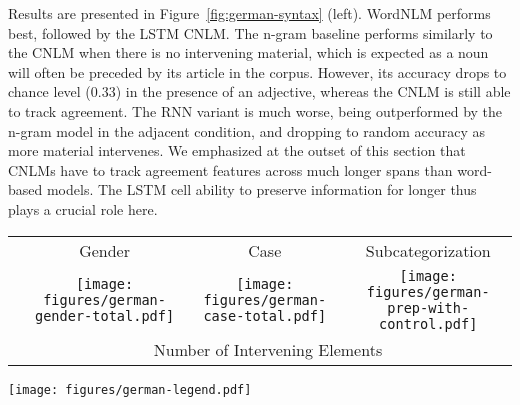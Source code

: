 Results are presented in Figure~\ref{fig:german-syntax}
(left). WordNLM performs best, followed by the LSTM CNLM.  The n-gram
baseline performs similarly to the CNLM when there is no intervening
material, which is expected as a noun will often be preceded by its
article in the corpus. However, its accuracy drops to chance level
(0.33) in the presence of an adjective, whereas the CNLM is still able
to track agreement. %
The RNN variant is much worse, being outperformed by the n-gram model
in the adjacent condition, and dropping to random accuracy as more
material intervenes. We emphasized at the outset of this section that
CNLMs have to track agreement features across much longer spans than
word-based models. The LSTM cell ability to preserve information for
longer thus plays a crucial role here.



\begin{figure*}
	\begin{tabular}{cccc}
		& Gender & Case & Subcategorization \\ 
		\raisebox{1.7\height}{\rotatebox[origin=c]{90}{Accuracy}}
		&
\texttt{[image: figures/german-gender-total.pdf]} 
		&
		\texttt{[image: figures/german-case-total.pdf]}
		&
\texttt{[image: figures/german-prep-with-control.pdf]} \\ 
		&\multicolumn{3}{c}{Number of Intervening Elements}
	\end{tabular}
\centering\texttt{[image: figures/german-legend.pdf]}
\caption{Accuracy on the German syntax tasks, as a function of the number of intervening elements.}\label{fig:german-syntax}
\end{figure*}

